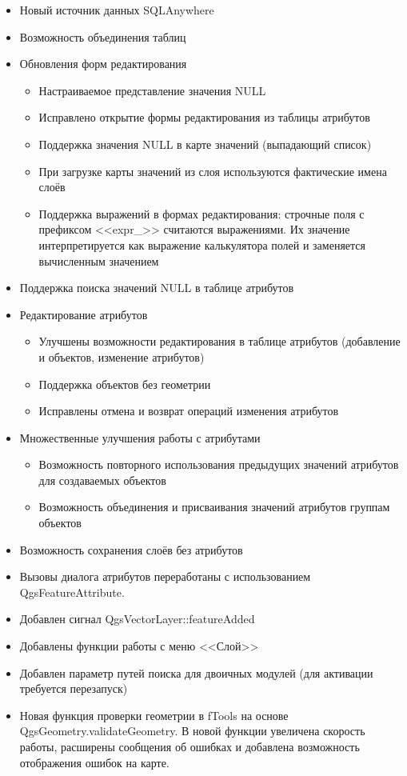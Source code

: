 
\begin{itemize}[label=--]
\item Новый источник данных SQLAnywhere
\item Возможность объединения таблиц
\item Обновления форм редактирования
\begin{itemize}[label=--]
\item Настраиваемое представление значения NULL
\item Исправлено открытие формы редактирования из таблицы атрибутов
\item Поддержка значения NULL в карте значений (выпадающий список)
\item При загрузке карты значений из слоя используются фактические имена слоёв
\item Поддержка выражений в формах редактирования: строчные поля с префиксом
<<expr\_>> считаются выражениями. Их значение интерпретируется как выражение
калькулятора полей и заменяется вычисленным значением
\end{itemize}
\item Поддержка поиска значений NULL в таблице атрибутов
\item Редактирование атрибутов
\begin{itemize}[label=--]
\item Улучшены возможности редактирования в таблице атрибутов (добавление и
объектов, изменение атрибутов)
\item Поддержка объектов без геометрии
\item Исправлены отмена и возврат операций изменения атрибутов
\end{itemize}
\item Множественные улучшения работы с атрибутами
\begin{itemize}[label=--]
\item Возможность повторного использования предыдущих значений атрибутов
для создаваемых объектов
\item Возможность объединения и присваивания значений атрибутов группам объектов
\end{itemize}
\item Возможность сохранения слоёв без атрибутов
\end{itemize}


\begin{itemize}[label=--]
\item Вызовы диалога атрибутов переработаны с использованием QgsFeatureAttribute.
\item Добавлен сигнал QgsVectorLayer::featureAdded
\item Добавлены функции работы с меню <<Слой>>
\item Добавлен параметр путей поиска для двоичных модулей (для активации
требуется перезапуск)
\item Новая функция проверки геометрии в fTools на основе QgsGeometry.validateGeometry.
В новой функции увеличена скорость работы, расширены сообщения об ошибках
и добавлена возможность отображения ошибок на карте.
\end{itemize}

